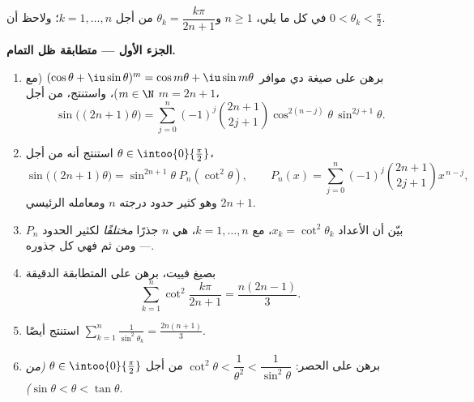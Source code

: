 \begin{problem}[{مسألة نهاية الأسبوع --- $\zeta(2) = \pi^2/6$ وبانوراما
برتران}]
\label{pb:b2:series:1}
في كل ما يلي، $n \geq 1$ و$\theta_k = \dfrac{k\pi}{2n+1}$ من أجل $k
= 1, \dots, n$؛ ولاحظ أن $0 < \theta_k < \frac\pi2$.

\medskip
\noindent\textbf{الجزء الأول --- متطابقة ظل التمام.}
\begin{enumerate}
  \item برهن على صيغة دي موافر $(\cos\theta +
        \iu\sin\theta)^m = \cos m\theta + \iu\sin m\theta$ (مع $m
        \in \N$)، واستنتج، من أجل $m = 2n + 1$،
        \[
        \sin\bigl((2n{+}1)\theta\bigr) = \sum_{j=0}^{n}
        (-1)^j\binom{2n+1}{2j+1}\cos^{2(n-j)}\theta\,
        \sin^{2j+1}\theta .
        \]
  \item استنتج أنه من أجل $\theta \in \intoo{0}{\frac\pi2}$،
        \[
        \sin\bigl((2n{+}1)\theta\bigr) =
        \sin^{2n+1}\theta\; P_n(\cot^2\theta),
        \qquad
        P_n(x) = \sum_{j=0}^{n}
        (-1)^j\binom{2n+1}{2j+1}x^{\,n-j},
        \]
        وهو كثير حدود درجته $n$ ومعامله الرئيسي $2n
        + 1$.
  \item بيّن أن الأعداد $x_k = \cot^2\theta_k$، مع $k = 1, \dots, n$، هي
        $n$ جذرًا \emph{مختلفًا} لكثير الحدود $P_n$ --- ومن ثم فهي كل
        جذوره.
  \item بصيغ فييت، برهن على المتطابقة الدقيقة
        \[
        \sum_{k=1}^{n} \cot^2\frac{k\pi}{2n+1}
        = \frac{n(2n-1)}{3}.
        \]
  \item استنتج أيضًا $\displaystyle\sum_{k=1}^{n}
        \frac{1}{\sin^2\theta_k} = \frac{2n(n+1)}{3}$.
  \item برهن على الحصر: $\cot^2\theta < \dfrac1{\theta^2} <
        \dfrac{1}{\sin^2\theta}$ من أجل $\theta \in
        \intoo{0}{\frac\pi2}$ \emph{(من $\sin\theta < \theta <
        \tan\theta$)}.
\end{enumerate}


\end{problem}
